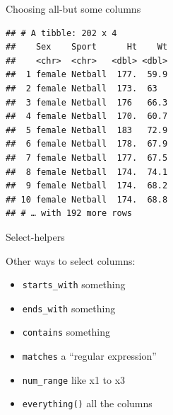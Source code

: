 \documentclass[ignorenonframetext,]{beamer}
\newenvironment{Shaded}{\begin{snugshade}}{\end{snugshade}}
\newcommand{\KeywordTok}[1]{\textcolor[rgb]{0.13,0.29,0.53}{\textbf{#1}}}
\newcommand{\NormalTok}[1]{#1}
\newcommand{\OperatorTok}[1]{\textcolor[rgb]{0.81,0.36,0.00}{\textbf{#1}}}
\newcommand{\StringTok}[1]{\textcolor[rgb]{0.31,0.60,0.02}{#1}}
\providecommand{\tightlist}{%
  \setlength{\itemsep}{0pt}\setlength{\parskip}{0pt}}
\begin{document}
\begin{frame}[fragile]{Choosing all-but some columns}
\protect\hypertarget{choosing-all-but-some-columns}{}

\begin{Shaded}
\end{Shaded}

\begin{verbatim}
## # A tibble: 202 x 4
##    Sex    Sport      Ht    Wt
##    <chr>  <chr>   <dbl> <dbl>
##  1 female Netball  177.  59.9
##  2 female Netball  173.  63  
##  3 female Netball  176   66.3
##  4 female Netball  170.  60.7
##  5 female Netball  183   72.9
##  6 female Netball  178.  67.9
##  7 female Netball  177.  67.5
##  8 female Netball  174.  74.1
##  9 female Netball  174.  68.2
## 10 female Netball  174.  68.8
## # … with 192 more rows
\end{verbatim}

\end{frame}

\begin{frame}[fragile]{Select-helpers}
\protect\hypertarget{select-helpers}{}

Other ways to select columns:

\begin{itemize}
\tightlist
\item
  \texttt{starts\_with} something
\item
  \texttt{ends\_with} something
\item
  \texttt{contains} something
\item
  \texttt{matches} a ``regular expression''
\item
  \texttt{num\_range} like x1 to x3
\item
  \texttt{everything()} all the columns
\end{itemize}

\end{frame}
\end{document}
